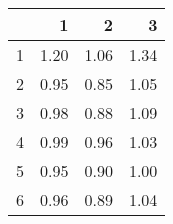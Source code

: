 \begin{table}[ht]
\begin{center}
\begin{tabular}{rrrr}
  \hline
 & 1 & 2 & 3 \\ 
  \hline
1 & 1.20 & 1.06 & 1.34 \\ 
  2 & 0.95 & 0.85 & 1.05 \\ 
  3 & 0.98 & 0.88 & 1.09 \\ 
  4 & 0.99 & 0.96 & 1.03 \\ 
  5 & 0.95 & 0.90 & 1.00 \\ 
  6 & 0.96 & 0.89 & 1.04 \\ 
   \hline
\end{tabular}
\end{center}
\end{table}
